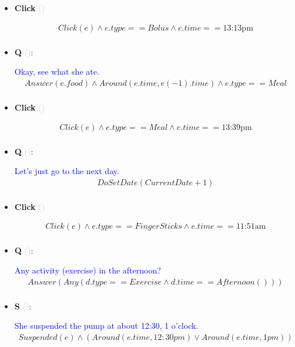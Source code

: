 \documentclass[11pt]{article}
\newcounter{CQ}
\newcounter{CS}
\newcounter{CClick}
\newcommand{\key}[1]{\textcolor{lightgray}{#1}}
\begin{document}
\begin{itemize}
	\item
	\textbf{Click\theCClick} \key{()} \addtocounter{CClick}{1}
	\begin{multline*}
	Click(e) \wedge e.type == Bolus \wedge e.time == \mbox{13:13pm} \\
	\end{multline*}
	
	
	\item
	\textbf{Q\theCQ} \key{()}: \addtocounter{CQ}{1}
	\textcolor{blue}{ Okay, see what she ate. }
	\begin{multline*}
	 Answer(e.food) \wedge Around(e.time, e(-1).time) \wedge e.type == Meal  \\
	\end{multline*}

	
	\item
	\textbf{Click\theCClick} \key{()} \addtocounter{CClick}{1}
	\begin{multline*}
	Click(e) \wedge e.type == Meal \wedge e.time == \mbox{13:39pm} \\
	\end{multline*}

	\item
	\textbf{Q\theCQ} \key{()}: \addtocounter{CQ}{1}
	\textcolor{blue}{ Let's just go to the next day. }
	\begin{multline*}
	DoSetDate(CurrentDate + 1) \\
	\end{multline*}
	
	
	\item
	\textbf{Click\theCClick} \key{()} \addtocounter{CClick}{1}
	\begin{multline*}
	Click(e) \wedge e.type == FingerSticks \wedge e.time == \mbox{11:51am} \\
	\end{multline*}
	
	
	
	\item
	\textbf{Q\theCQ} \key{()}: \addtocounter{CQ}{1}
	\textcolor{blue}{ Any activity (exercise) in the afternoon? }
	\begin{multline*}
	Answer(Any(d.type==Exercise \wedge d.time==Afternoon()))  \\
	\end{multline*}
	
	
    \item
	\textbf{S\theCS} \key{()}: \addtocounter{CS}{1}
	\textcolor{blue}{ She suspended the pump at about 12:30, 1 o'clock. }
	\begin{multline*}
	Suspended(e) \wedge (Around(e.time, 12:30pm) \vee Around(e.time, 1pm)) \\
	\end{multline*}
	

\end{itemize}
\end{document}
